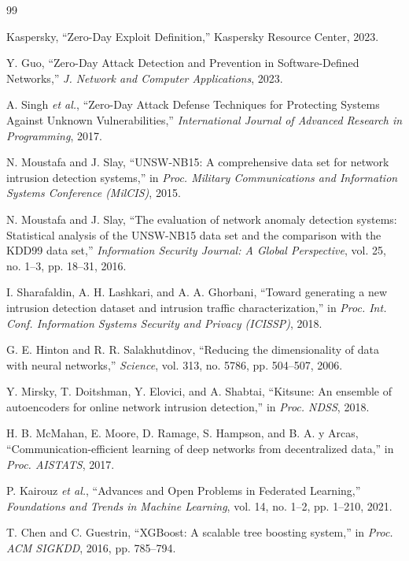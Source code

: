 \documentclass[conference]{IEEEtran}
\begin{document}
\begin{thebibliography}{99}

Kaspersky, ``Zero-Day Exploit Definition,'' Kaspersky Resource Center, 2023.

Y. Guo, ``Zero-Day Attack Detection and Prevention in Software-Defined Networks,'' \emph{J. Network and Computer Applications}, 2023.

A. Singh \emph{et al.}, ``Zero-Day Attack Defense Techniques for Protecting Systems Against Unknown Vulnerabilities,'' \emph{International Journal of Advanced Research in Programming}, 2017.

N. Moustafa and J. Slay, ``UNSW-NB15: A comprehensive data set for network intrusion detection systems,'' in \emph{Proc. Military Communications and Information Systems Conference (MilCIS)}, 2015.

N. Moustafa and J. Slay, ``The evaluation of network anomaly detection systems: Statistical analysis of the UNSW-NB15 data set and the comparison with the KDD99 data set,'' \emph{Information Security Journal: A Global Perspective}, vol. 25, no. 1--3, pp. 18--31, 2016.

I. Sharafaldin, A. H. Lashkari, and A. A. Ghorbani, ``Toward generating a new intrusion detection dataset and intrusion traffic characterization,'' in \emph{Proc. Int. Conf. Information Systems Security and Privacy (ICISSP)}, 2018.

G. E. Hinton and R. R. Salakhutdinov, ``Reducing the dimensionality of data with neural networks,'' \emph{Science}, vol. 313, no. 5786, pp. 504--507, 2006.

Y. Mirsky, T. Doitshman, Y. Elovici, and A. Shabtai, ``Kitsune: An ensemble of autoencoders for online network intrusion detection,'' in \emph{Proc. NDSS}, 2018.

H. B. McMahan, E. Moore, D. Ramage, S. Hampson, and B. A. y Arcas, ``Communication-efficient learning of deep networks from decentralized data,'' in \emph{Proc. AISTATS}, 2017.

P. Kairouz \emph{et al.}, ``Advances and Open Problems in Federated Learning,'' \emph{Foundations and Trends in Machine Learning}, vol. 14, no. 1--2, pp. 1--210, 2021.

T. Chen and C. Guestrin, ``XGBoost: A scalable tree boosting system,'' in \emph{Proc. ACM SIGKDD}, 2016, pp. 785--794.


\end{thebibliography}
\end{document}
